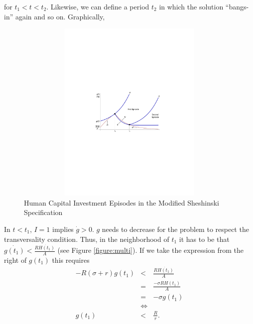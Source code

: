 \noindent for $t_{1} < t < t_{2}$. Likewise, we can define a period $t_{2}$ in which the solution ``bangs-in'' again and so on. Graphically,

\begin{center}
\begin{figure}[H]
\caption{Human Capital Investment Episodes in the Modified Sheshinski Specification} \label{figure:multi}
\centering
\includegraphics[width=4.5in, height=3.5in]{Figures/fig-shesh-one-traj.pdf}
\end{figure}
\end{center}

\indent In $t < t_{1}$, $I = 1$ implies $\dot{g} > 0$. $g$ needs to decrease for the problem to respect the transversality condition. Thus, in the neighborhood of $t_{1}$ it has to be that $\dot{g(t_{1})} < \frac{R \dot{H(t_{1})}}{A}$ (see Figure \eqref{figure:multi}). If we take the expression from the right of $g(t_{1})$ this requires
\begin{eqnarray}
- R (\sigma + r) g(t_{1}) &<& \frac{R \dot{H(t_{1})}}{A} \nonumber \\
&=& \frac{- \sigma R H(t_{1})}{A} \nonumber \\
&=& -\sigma g(t_{1}) \nonumber \\
&\Leftrightarrow& \nonumber \\
g(t_{1}) &<& \frac{R}{r}.  
\end{eqnarray}

